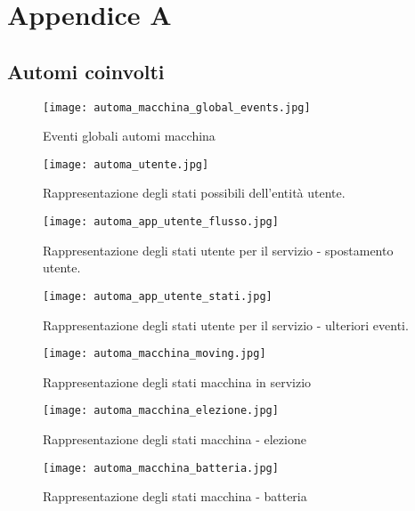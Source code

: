 
\chapter{Appendice A}
  

\section{Automi coinvolti}

\begin{figure}[htbp]
	\centering
	\texttt{[image: automa\_macchina\_global\_events.jpg]}
	\caption{Eventi globali automi macchina}
	\label{fig:automi_macchina_various}
\end{figure}

\begin{figure}[htbp]
	\centering
	\texttt{[image: automa\_utente.jpg]}
	\caption{Rappresentazione degli stati possibili dell'entità utente.}
	\label{fig:automa_utente}
\end{figure}

\begin{figure}[htbp]
	\centering
	\texttt{[image: automa\_app\_utente\_flusso.jpg]}
	\caption{Rappresentazione degli stati utente per il servizio - spostamento utente.}
	\label{fig:automa_app_utente_flusso}
\end{figure}

\begin{figure}[htbp]
	\centering
	\texttt{[image: automa\_app\_utente\_stati.jpg]}
	\caption{Rappresentazione degli stati utente per il servizio - ulteriori eventi.}
	\label{fig:automa_app_utente_stati}
\end{figure}

\begin{figure}[htbp]
	\centering
	\texttt{[image: automa\_macchina\_moving.jpg]}
	\caption{Rappresentazione degli stati macchina in servizio}
	\label{fig:automa_moving}
\end{figure}

\begin{figure}[htbp]
	\centering
	\texttt{[image: automa\_macchina\_elezione.jpg]}
	\caption{Rappresentazione degli stati macchina - elezione}
	\label{fig:automa_elezione}
\end{figure}

\begin{figure}[htbp]
	\centering
	\texttt{[image: automa\_macchina\_batteria.jpg]}
	\caption{Rappresentazione degli stati macchina - batteria}
	\label{fig:automa_batteria}
\end{figure}

